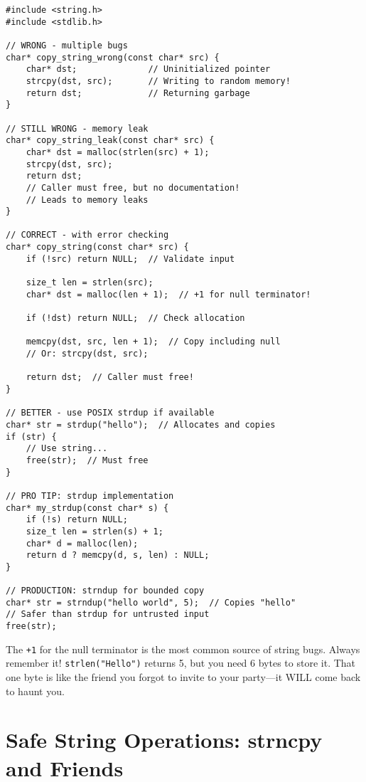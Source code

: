 \begin{lstlisting}
#include <string.h>
#include <stdlib.h>

// WRONG - multiple bugs
char* copy_string_wrong(const char* src) {
    char* dst;              // Uninitialized pointer
    strcpy(dst, src);       // Writing to random memory!
    return dst;             // Returning garbage
}

// STILL WRONG - memory leak
char* copy_string_leak(const char* src) {
    char* dst = malloc(strlen(src) + 1);
    strcpy(dst, src);
    return dst;
    // Caller must free, but no documentation!
    // Leads to memory leaks
}

// CORRECT - with error checking
char* copy_string(const char* src) {
    if (!src) return NULL;  // Validate input

    size_t len = strlen(src);
    char* dst = malloc(len + 1);  // +1 for null terminator!

    if (!dst) return NULL;  // Check allocation

    memcpy(dst, src, len + 1);  // Copy including null
    // Or: strcpy(dst, src);

    return dst;  // Caller must free!
}

// BETTER - use POSIX strdup if available
char* str = strdup("hello");  // Allocates and copies
if (str) {
    // Use string...
    free(str);  // Must free
}

// PRO TIP: strdup implementation
char* my_strdup(const char* s) {
    if (!s) return NULL;
    size_t len = strlen(s) + 1;
    char* d = malloc(len);
    return d ? memcpy(d, s, len) : NULL;
}

// PRODUCTION: strndup for bounded copy
char* str = strndup("hello world", 5);  // Copies "hello"
// Safer than strdup for untrusted input
free(str);
\end{lstlisting}

\begin{notebox}
The \texttt{+1} for the null terminator is the most common source of string bugs. Always remember it! \texttt{strlen("Hello")} returns 5, but you need 6 bytes to store it. That one byte is like the friend you forgot to invite to your party—it WILL come back to haunt you.
\end{notebox}

\section{Safe String Operations: strncpy and Friends}

